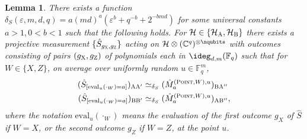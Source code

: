 \documentclass[11pt]{article}
\newtheorem{lemma}[theorem]{Lemma}
\theoremstyle{definition}
\newcommand{\C}{\ensuremath{\mathbb{C}}}
\newcommand{\F}{\ensuremath{\mathbb{F}}}
\newcommand{\mH}{\ensuremath{\mathcal{H}}}
\newcommand{\eps}{\varepsilon}
\newcommand{\labelstyle}[1]{\ensuremath{\textsc{#1}}\xspace}
\newcommand{\xpt}{\labelstyle{X}}
\newcommand{\zpt}{\labelstyle{Z}}
\newcommand{\alice}{\labelstyle{A}}
\newcommand{\bob}{\labelstyle{B}}
\newcommand{\typestyle}[1]{\ensuremath{\textsc{#1}}\xspace}
\newcommand{\Point}{\typestyle{Point}}
\newcommand{\eval}{\mathrm{eval}}
\begin{document}
\begin{lemma}\label{lem:qld-4-7}
There exists a function $\delta_S(\eps,m,d,q) = a(md)^a (\eps^b + q^{-b} + 2^{-bmd})$ for some universal constants $a > 1, 0 < b < 1$ such that the following holds. For $\mH \in \{\mH_\alice,\mH_\bob\}$ there exists a projective measurement $\{ \hat{S}_{g_\xpt,g_\zpt} \}$ acting on $\mathcal{H} \otimes (\C^q)^{\otimes \nqubits}$ with outcomes consisting of pairs $(g_\xpt,g_\zpt)$ of polynomials each in $\ideg_{d,m}(\F_q)$ such that for $W \in \{X,Z\}$, on average over uniformly random $u \in \F_q^m$,
\begin{align}
  (\hat{S}_{[\eval_{u}(\cdot_{W}) = a]})_{\alice \alice'} &\simeq_{\delta_S} (\hat{M}^{(\Point, W), u}_{a})_{\bob \alice''} \label{eq:qld-s-point-con-alice} \\ 
    (\hat{S}_{[\eval_{u}(\cdot_{W}) = a]})_{\bob \bob'} &\simeq_{\delta_S} (\hat{M}^{(\Point, W), u}_{a})_{\alice \bob''} \label{eq:qld-s-point-con-bob},
\end{align}
where the notation $\eval_{u}(\cdot_W)$ means the evaluation of the first outcome $g_X$ of $\hat{S}$ if $W = X$, or the second outcome $g_Z$ if $W = Z$, at the point $u$.
\end{lemma}
\end{document}

